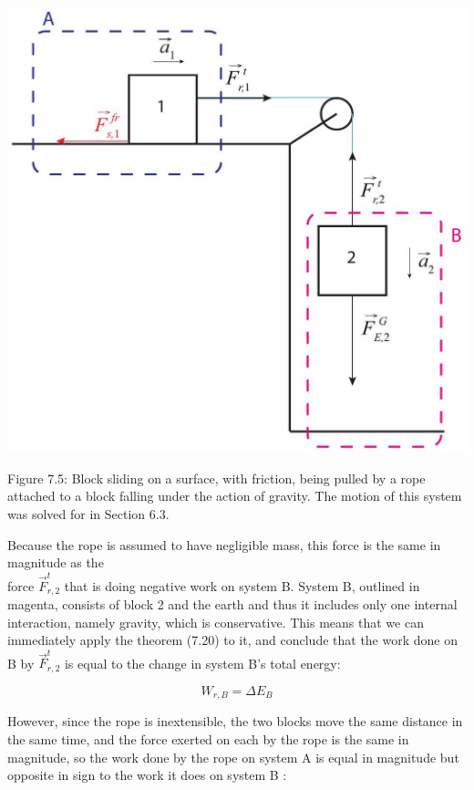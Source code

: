 \documentclass[10pt]{article}
\begin{document}
\begin{center}
\includegraphics[max width=\textwidth]{2024_09_14_9969b06773f10b6936e8g-166}
\end{center}

Figure 7.5: Block sliding on a surface, with friction, being pulled by a rope attached to a block falling under the action of gravity. The motion of this system was solved for in Section 6.3.

Because the rope is assumed to have negligible mass, this force is the same in magnitude as the\\
force $\vec{F}_{r, 2}^{t}$ that is doing negative work on system B. System B, outlined in magenta, consists of block 2 and the earth and thus it includes only one internal interaction, namely gravity, which is conservative. This means that we can immediately apply the theorem (7.20) to it, and conclude that the work done on B by $\vec{F}_{r, 2}^{t}$ is equal to the change in system B's total energy:


\begin{equation*}
W_{r, B}=\Delta E_{B} \tag{7.23}
\end{equation*}


However, since the rope is inextensible, the two blocks move the same distance in the same time, and the force exerted on each by the rope is the same in magnitude, so the work done by the rope on system A is equal in magnitude but opposite in sign to the work it does on system B :
\end{document}
